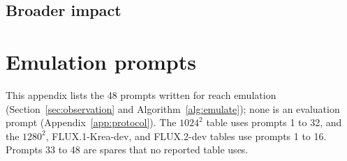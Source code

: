 \subsection{Broader impact}
\label{app:impact}

\apximpacttext

\fi
\ifshortversion\else
\apxbarrier
\section{Emulation prompts}
\label{app:prompts}

This appendix lists the 48 prompts written for reach emulation (Section~\ref{sec:observation} and Algorithm~\ref{alg:emulate}); none is an evaluation prompt (Appendix~\ref{app:protocol}). The $1024^2$ table uses prompts 1 to 32, and the $1280^2$, FLUX.1-Krea-dev, and FLUX.2-dev tables use prompts 1 to 16. Prompts 33 to 48 are spares that no reported table uses.

